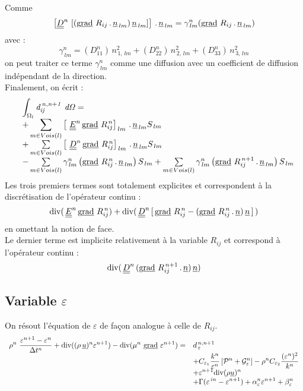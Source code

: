 Comme $$\left[ \underline{\underline{D}}^n\,\left[ (\text{g}\underline{\text{rad}}\ {R}_{ij}\,.\,\underline{n}_{\,lm})\,\underline{n}_{\,lm}
\right] \right]\,.\,\underline{n}_{\,lm}  = \gamma^n_{\,lm} (\text{g}\underline{\text{rad}}\ {R}_{ij}\,.\,\underline{n}_{\,lm})$$
 avec :
$$\gamma^n_{\,lm} = (D^n_{11})\,n^2_{\,1,\,lm} + (D^n_{22})\,n^2_{\,2,\,lm} +
(D^n_{33})\,n^2_{\,3,\,lm}$$
 on peut traiter ce terme $\gamma^n_{\,lm}$ comme une diffusion avec un
coefficient de diffusion ind\'ependant de la direction.\\

Finalement, on \'ecrit :
\begin{equation}
\begin{array} {lll}
&\displaystyle\int_{\Omega_l} \it{d}_{ij}^{\,n,n+1}\ d\Omega =\\
&\displaystyle
+ \sum\limits_{m\in
Vois(l)} \left[\ \underline{\underline{E}}^n\,\text{g}\underline{\text{rad}}\ {R}^{\,n}_{ij} \right]_{\,lm}\,.\,\underline{n}_{\,lm}S_{\,lm}\\
&+ \sum\limits_{m\in Vois(l)} \left[\
\underline{\underline{D}}^n\,\text{g}\underline{\text{rad}}\ {R}^{\,n}_{ij} \right]_{\,lm}\,.\,\underline{n}_{\,lm}S_{\,lm}\\
& - \sum\limits_{m\in Vois(l)} \gamma^n_{\,lm} \left(
\text{g}\underline{\text{rad}}\ {R}^{\,n}_{ij}\,.\,\underline{n}_{\,lm} \right) S_{\,lm} +  \sum\limits_{m\in
Vois(l)} \gamma^n_{\,lm} \left( \text{g}\underline{\text{rad}}\ {R}^{\,n+1}_{ij}\,.\,\underline{n}_{\,lm} \right)  S_{\,lm}
\end{array}
\end{equation}
Les trois premiers termes sont totalement explicites et correspondent \`a la
discr\'etisation de l'op\'erateur continu :
$$\text{div}(\,\underline{\underline{E}}^n\,\text{g}\underline{\text{rad}}\ {R}^{\,n}_{ij}) + \text{div}(\,\underline{\underline{D}}^n\,[\,\text{g}\underline{\text{rad}}\ {R}^{\,n}_{ij} - ( \text{g}\underline{\text{rad}}\ {R}^{\,n}_{ij}\,.\,\underline{n}
)\,\underline{n}\,]\,)$$ en omettant la notion de face.\\
Le dernier terme est implicite relativement \`a la variable $R_{ij}$ et correspond \`a l'op\'erateur continu :
 $$\text{div}(\,\underline{\underline{D}}^n\,(\text{g}\underline{\text{rad}}\ {R}^{\,n+1}_{ij}\,.\,\underline{n} )\,\underline{n})$$
\subsection{\bf Variable $\varepsilon$ }
On r\'esout l'\'equation de $\varepsilon$ de fa\c con analogue \`a celle de
$R_{ij}$.
\begin{equation}
\begin{array}{ll}
\displaystyle
\rho^n\ \frac {\varepsilon^{n+1}-\varepsilon^{n}}{\Delta t^n} +
\text{div}((\rho\,\underline{u})^{n} \varepsilon^{n+1})
- \text{div}(\mu^n\ \text{g}\underline{\text{rad}}\  \varepsilon^{n+1})
=  &
\displaystyle
d_{\,\varepsilon}^{\,n,n+1} \\
&
\displaystyle
+ C_{\varepsilon_1} \frac{k^n}{\varepsilon^n} \left[ \mathcal{P}^n + \mathcal{G}^n_{\varepsilon} \right]
- \rho^n C_{\varepsilon_2} \frac{(\varepsilon^n)^2}{k^n} \\
&
\displaystyle
+ \varepsilon^{n+1} \text{div}{(\rho \underline{u})^n} \\
&
\displaystyle
+ \Gamma(\varepsilon^{\,in} - \varepsilon^{n+1})
+ \alpha^n_{\varepsilon} \varepsilon^{n+1} + \beta^n_{\varepsilon}
\end{array}
\end{equation}

